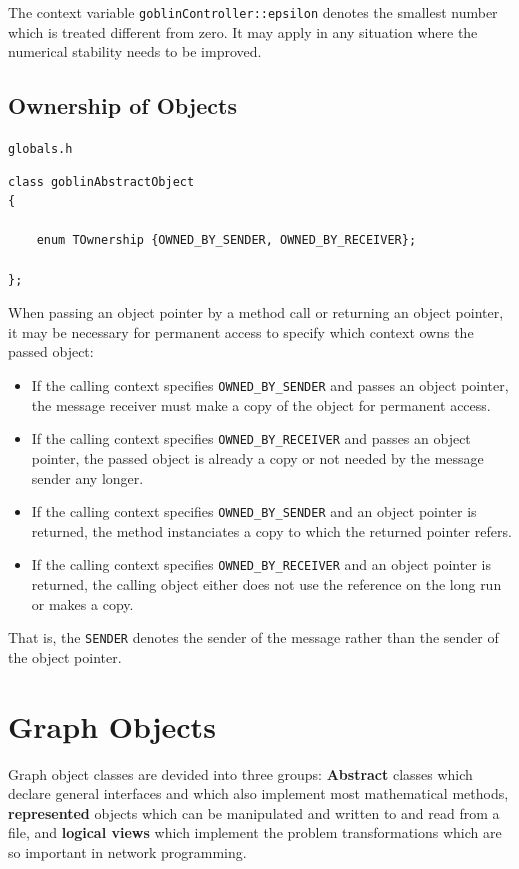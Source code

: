 \documentclass[a4paper,11pt,twoside]{book}
\begin{document}
\begin{multicols}{2}
The context variable \verb/goblinController::epsilon/ denotes the smallest
number which is treated different from zero. It may apply in any situation
where the numerical stability needs to be improved.


\section{Ownership of Objects}
\label{slb_ownership}
\myinclude\verb/globals.h/
\begin{mymethods}
\begin{verbatim}
class goblinAbstractObject
{

    enum TOwnership {OWNED_BY_SENDER, OWNED_BY_RECEIVER};

};
\end{verbatim}
\end{mymethods}
When passing an object pointer by a method call or returning an object pointer,
it may be necessary for permanent access to specify which context owns the
passed object:
\begin{itemize}
\item If the calling context specifies \verb/OWNED_BY_SENDER/ and passes an
    object pointer, the message receiver must make a copy of the
    object for permanent access.
\item If the calling context specifies \verb/OWNED_BY_RECEIVER/ and passes
    an object pointer, the passed object is already a copy or not
    needed by the message sender any longer.
\item If the calling context specifies \verb/OWNED_BY_SENDER/ and an object
    pointer is returned, the method instanciates a copy to which the
    returned pointer refers.
\item If the calling context specifies \verb/OWNED_BY_RECEIVER/ and an object
    pointer is returned, the calling object either does not use the reference
    on the long run or makes a copy.
\end{itemize}
That is, the \verb/SENDER/ denotes the sender of the message rather than the
sender of the object pointer.



\cleardoublepage
{}
\chapter{Graph Objects}
\thispagestyle{fancy}
\label{clb2}

Graph object classes are devided into three groups: {\bf Abstract} classes which
declare general interfaces and which also implement most mathematical methods,
{\bf represented} objects which can be manipulated and written to and read
from a file, and {\bf logical views} which implement the problem transformations
which are so important in network programming.



\end{multicols}
\end{document}
